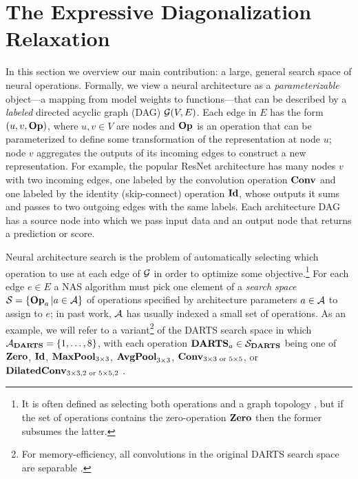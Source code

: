 
\section{The Expressive Diagonalization Relaxation}\label{sec:relax}

In this section we overview our main contribution:
a large, general search space of neural operations.
Formally, we view a neural architecture as a {\em parameterizable} object---a mapping from model weights to functions---that can be described by a {\em labeled} directed acyclic graph (DAG) $\mathcal G(V,E)$.
Each edge in $E$ has the form $(u,v,\operatorname{\operatorname{\bf Op}})$, where $u,v\in V$ are nodes and $\operatorname{\operatorname{\bf Op}}$ is an operation that can be parameterized to define some transformation of the representation at node $u$;
node $v$ aggregates the outputs of its incoming edges to construct a new representation.
For example, the popular ResNet architecture \citep{he2016resnet} has many nodes $v$ with two incoming edges, one labeled by the convolution operation $\operatorname{\operatorname{\bf Conv}}$ and one labeled by the identity (skip-connect) operation $\operatorname{\operatorname{\bf Id}}$, whose outputs it sums and passes to two outgoing edges with the same labels.
Each architecture DAG has a source node into which we pass input data and an output node that returns a prediction or score.

Neural architecture search is the problem of automatically selecting which operation to use at each edge of $\mathcal G$ in order to optimize some objective.\footnote{It is often defined as selecting both operations and a graph topology \citep{zoph2018nas}, but if the set of operations contains the zero-operation $\operatorname{\operatorname{\bf Zero}}$ then the former subsumes the latter.}
For each edge $e\in E$ a NAS algorithm must pick one element of a {\em search space} $\mathcal S=\{\operatorname{\operatorname{\bf Op}}_a\vert a\in\mathcal A\}$ of operations specified by architecture parameters $a\in\mathcal A$ to assign to $e$;
in past work, $\mathcal A$ has usually indexed a small set of operations.
As an example, we will refer to a variant\footnote{For memory-efficiency, all convolutions in the original DARTS search space are separable \citep{liu2019darts}.} of the DARTS search space in which $\mathcal A_{\mathbf{DARTS}}=\{1,\dots,8\}$, with each operation $\mathbf{DARTS}_a\in\mathcal S_{\mathbf{DARTS}}$ being one of $\operatorname{\operatorname{\bf Zero}}$, $\operatorname{\operatorname{\bf Id}}$, $\operatorname{\operatorname{\bf MaxPool}}_{3\times 3}$, $\operatorname{\operatorname{\bf AvgPool}}_{3\times 3}$, $\operatorname{\operatorname{\bf Conv}}_{3\times 3\textrm{ or }5\times 5}$, or $\operatorname{\operatorname{\bf DilatedConv}}_{3\times 3,2\textrm{ or }5\times 5,2}$ \citep{liu2019darts}.

